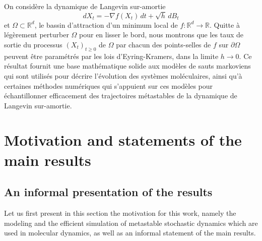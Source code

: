 \documentclass[JEP,XML,SOM,Unicode,NoEqCountersInSection,NoFloatCountersInSection,published]{cedram}
\theoremstyle{plain}
\theoremstyle{definition}
\begin{document}




\begin{altabstract}
On considère la dynamique de Langevin sur-amortie
\[
dX_t = -\nabla f(X_t) \, dt + \sqrt{h} \, dB_t
\]
et $\Omega \subset \mathbb{R}^d$, le bassin d’attraction d’un minimum local de $f: \mathbb{R}^d \to \mathbb{R}$. Quitte à légèrement perturber $\Omega$ pour en lisser le bord, nous montrons que les taux de sortie du processus $(X_t)_{t \ge 0}$ de $\Omega$ par chacun des points-selles de $f$ sur $\partial \Omega$ peuvent être paramétrés par les lois d’Eyring-Kramers, dans la limite $h \to 0$. Ce résultat fournit une base mathématique solide aux modèles de sauts markoviens qui sont utilisés pour décrire l’évolution des systèmes moléculaires, ainsi qu’à certaines méthodes numériques qui s’appuient sur ces modèles pour échantillonner efficacement des trajectoires métastables de la dynamique de Langevin sur-amortie.
\end{altabstract}

\maketitle
\vspace*{-\baselineskip}
\tableofcontents
\mainmatter

\section{Motivation and statements of the main results}\label{sec:intro}

\subsection{An informal presentation of the results}\label{sec:informal}

Let us first present in this section the motivation for this work,
namely the modeling and the efficient simulation of metastable
stochastic dynamics which are used in molecular dynamics, as well as
an informal statement of the main results.
\end{document}

